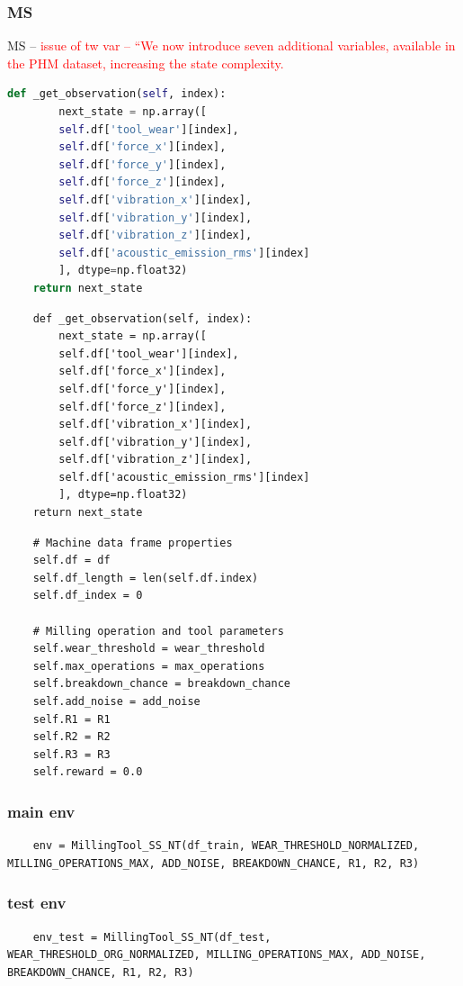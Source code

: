 \documentclass[a4paper, 12pt]{article}
\begin{document}
\subsubsection{MS}
MS -- \textcolor{red}{issue of tw var -- ``We now introduce seven additional variables, available in the PHM dataset, increasing the state complexity.} 
\begin{lstlisting}[language=Python]
	def _get_observation(self, index):
		next_state = np.array([
		self.df['tool_wear'][index],
		self.df['force_x'][index],
		self.df['force_y'][index],
		self.df['force_z'][index],
		self.df['vibration_x'][index],
		self.df['vibration_y'][index],
		self.df['vibration_z'][index],
		self.df['acoustic_emission_rms'][index]
		], dtype=np.float32)
	return next_state
\end{lstlisting}

\begin{verbatim}
	def _get_observation(self, index):
		next_state = np.array([
		self.df['tool_wear'][index],
		self.df['force_x'][index],
		self.df['force_y'][index],
		self.df['force_z'][index],
		self.df['vibration_x'][index],
		self.df['vibration_y'][index],
		self.df['vibration_z'][index],
		self.df['acoustic_emission_rms'][index]
		], dtype=np.float32)
	return next_state
\end{verbatim}



\begin{verbatim}
	# Machine data frame properties
	self.df = df
	self.df_length = len(self.df.index)
	self.df_index = 0
	
	# Milling operation and tool parameters
	self.wear_threshold = wear_threshold
	self.max_operations = max_operations
	self.breakdown_chance = breakdown_chance
	self.add_noise = add_noise
	self.R1 = R1
	self.R2 = R2
	self.R3 = R3
	self.reward = 0.0
\end{verbatim}

\subsubsection{main env}
\begin{verbatim}
	env = MillingTool_SS_NT(df_train, WEAR_THRESHOLD_NORMALIZED, MILLING_OPERATIONS_MAX, ADD_NOISE, BREAKDOWN_CHANCE, R1, R2, R3)
\end{verbatim}

\subsubsection{test env}
\begin{verbatim}
	env_test = MillingTool_SS_NT(df_test, WEAR_THRESHOLD_ORG_NORMALIZED, MILLING_OPERATIONS_MAX, ADD_NOISE, BREAKDOWN_CHANCE, R1, R2, R3)
\end{verbatim}
\end{document}
